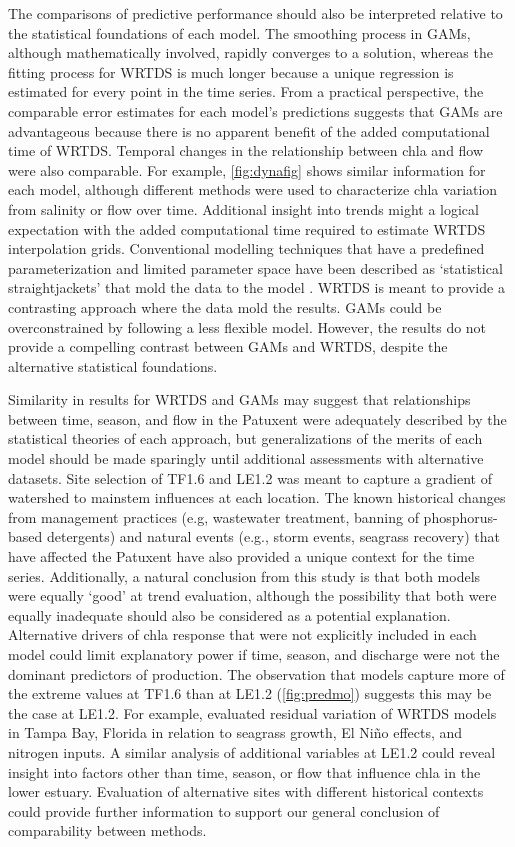 \documentclass{svjour3}\usepackage[]{graphicx}\usepackage[]{color}
\begin{document}
The comparisons of predictive performance should also be interpreted relative to the statistical foundations of each model.  The smoothing process in \acp{GAM}, although mathematically involved, rapidly converges to a solution, whereas the fitting process for \ac{WRTDS} is much longer because a unique regression is estimated for every point in the time series.  From a practical perspective, the comparable error estimates for each model's predictions suggests that \acp{GAM} are advantageous because there is no apparent benefit of the added computational time of \ac{WRTDS}.  Temporal changes in the relationship between \ac{chla} and flow were also comparable.  For example, \cref{fig:dynafig} shows similar information for each model, although different methods were used to characterize \ac{chla} variation from salinity or flow over time.  Additional insight into trends might a logical expectation with the added computational time required to estimate \ac{WRTDS} interpolation grids.  Conventional modelling techniques that have a predefined parameterization and limited parameter space have been described as `statistical straightjackets' that mold the data to the model \cite{Hirsch14b}.  \ac{WRTDS} is meant to provide a contrasting approach where the data mold the results. \acp{GAM} could be overconstrained by following a less flexible model.  However, the results do not provide a compelling contrast between \acp{GAM} and \ac{WRTDS}, despite the alternative statistical foundations.  

Similarity in results for \ac{WRTDS} and \acp{GAM} may suggest that relationships between time, season, and flow in the Patuxent were adequately described by the statistical theories of each approach, but generalizations of the merits of each model should be made sparingly until additional assessments with alternative datasets.  Site selection of TF1.6 and LE1.2 was meant to capture a gradient of watershed to mainstem influences at each location.  The known historical changes from management practices (e.g, wastewater treatment, banning of phosphorus-based detergents) and natural events (e.g., storm events, seagrass recovery) that have affected the Patuxent have also provided a unique context for the time series.  Additionally, a natural conclusion from this study is that both models were equally `good' at trend evaluation, although the possibility that both were equally inadequate should also be considered as a potential explanation.  Alternative drivers of \ac{chla} response that were not explicitly included in each model could limit explanatory power if time, season, and discharge were not the dominant predictors of production. The observation that models capture more of the extreme values at TF1.6 than at LE1.2 (\cref{fig:predmo}) suggests this may be the case at LE1.2.  For example, \cite{Beck15} evaluated residual variation of \ac{WRTDS} models in Tampa Bay, Florida in relation to seagrass growth, El Ni\~no effects, and nitrogen inputs.  A similar analysis of additional variables at LE1.2 could reveal insight into factors other than time, season, or flow that influence \ac{chla} in the lower estuary. Evaluation of alternative sites with different historical contexts could provide further information to support our general conclusion of comparability between methods.    
\end{document}
